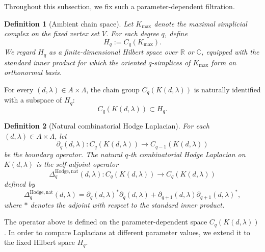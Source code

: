 \documentclass[pdflatex,sn-mathphys-num]{sn-jnl}%
\theoremstyle{thmstyleone}%
\theoremstyle{thmstyletwo}%
\theoremstyle{thmstylethree}%
\newtheorem{definition}{Definition}%
\begin{document}

Throughout this subsection, we fix such a parameter-dependent filtration.

\begin{definition}[Ambient chain space]
Let \(K_{\max}\) denote the maximal simplicial complex on the fixed vertex set
\(V\). For each degree \(q\), define
\[
H_q:=C_q(K_{\max}).
\]
We regard \(H_q\) as a finite-dimensional Hilbert space over \(\mathbb{R}\) or
\(\mathbb{C}\), equipped with the standard inner product for which the oriented
\(q\)-simplices of \(K_{\max}\) form an orthonormal basis.
\end{definition}

For every \((d,\lambda)\in A\times\Lambda\), the chain group
\(C_q(K(d,\lambda))\) is naturally identified with a subspace of \(H_q\):
\[
C_q(K(d,\lambda))\subset H_q.
\]

\begin{definition}[Natural combinatorial Hodge Laplacian]
For each \((d,\lambda)\in A\times\Lambda\), let
\[
\partial_q(d,\lambda):
C_q(K(d,\lambda))\longrightarrow C_{q-1}(K(d,\lambda))
\]
be the boundary operator. The \emph{natural \(q\)-th combinatorial Hodge
Laplacian} on \(K(d,\lambda)\) is the self-adjoint operator
\[
\Delta_q^{\mathrm{Hodge},\mathrm{nat}}(d,\lambda)
:
C_q(K(d,\lambda))\longrightarrow C_q(K(d,\lambda))
\]
defined by
\[
\Delta_q^{\mathrm{Hodge},\mathrm{nat}}(d,\lambda)
=
\partial_q(d,\lambda)^\ast\partial_q(d,\lambda)
+
\partial_{q+1}(d,\lambda)\partial_{q+1}(d,\lambda)^\ast,
\]
where \(\ast\) denotes the adjoint with respect to the standard inner product.
\end{definition}

The operator above is defined on the parameter-dependent space
\(C_q(K(d,\lambda))\). In order to compare Laplacians at different parameter
values, we extend it to the fixed Hilbert space \(H_q\).
\end{document}
